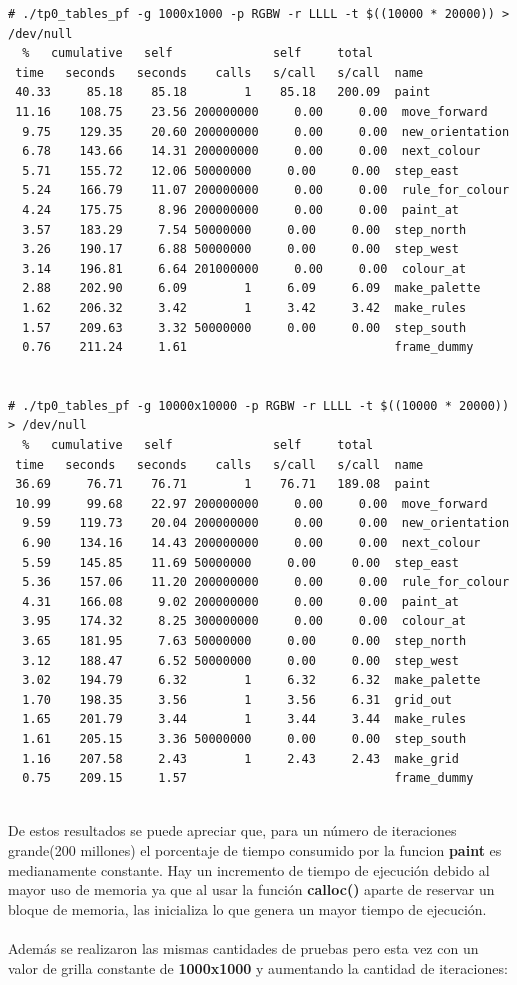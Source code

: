 \documentclass[a4paper, 10pt, twoside, notitlepage]{article}
\begin{document}
\begin{verbatim}
# ./tp0_tables_pf -g 1000x1000 -p RGBW -r LLLL -t $((10000 * 20000)) > /dev/null
  %   cumulative   self              self     total           
 time   seconds   seconds    calls   s/call   s/call  name    
 40.33     85.18    85.18        1    85.18   200.09  paint
 11.16    108.75    23.56 200000000     0.00     0.00  move_forward
  9.75    129.35    20.60 200000000     0.00     0.00  new_orientation
  6.78    143.66    14.31 200000000     0.00     0.00  next_colour
  5.71    155.72    12.06 50000000     0.00     0.00  step_east
  5.24    166.79    11.07 200000000     0.00     0.00  rule_for_colour
  4.24    175.75     8.96 200000000     0.00     0.00  paint_at
  3.57    183.29     7.54 50000000     0.00     0.00  step_north
  3.26    190.17     6.88 50000000     0.00     0.00  step_west
  3.14    196.81     6.64 201000000     0.00     0.00  colour_at
  2.88    202.90     6.09        1     6.09     6.09  make_palette
  1.62    206.32     3.42        1     3.42     3.42  make_rules
  1.57    209.63     3.32 50000000     0.00     0.00  step_south
  0.76    211.24     1.61                             frame_dummy


# ./tp0_tables_pf -g 10000x10000 -p RGBW -r LLLL -t $((10000 * 20000)) > /dev/null
  %   cumulative   self              self     total           
 time   seconds   seconds    calls   s/call   s/call  name    
 36.69     76.71    76.71        1    76.71   189.08  paint
 10.99     99.68    22.97 200000000     0.00     0.00  move_forward
  9.59    119.73    20.04 200000000     0.00     0.00  new_orientation
  6.90    134.16    14.43 200000000     0.00     0.00  next_colour
  5.59    145.85    11.69 50000000     0.00     0.00  step_east
  5.36    157.06    11.20 200000000     0.00     0.00  rule_for_colour
  4.31    166.08     9.02 200000000     0.00     0.00  paint_at
  3.95    174.32     8.25 300000000     0.00     0.00  colour_at
  3.65    181.95     7.63 50000000     0.00     0.00  step_north
  3.12    188.47     6.52 50000000     0.00     0.00  step_west
  3.02    194.79     6.32        1     6.32     6.32  make_palette
  1.70    198.35     3.56        1     3.56     6.31  grid_out
  1.65    201.79     3.44        1     3.44     3.44  make_rules
  1.61    205.15     3.36 50000000     0.00     0.00  step_south
  1.16    207.58     2.43        1     2.43     2.43  make_grid
  0.75    209.15     1.57                             frame_dummy


\end{verbatim}
\normalsize
De estos resultados se puede apreciar que, para un número de iteraciones grande(200 millones) el porcentaje de tiempo consumido por la funcion \textbf{paint} es medianamente constante. Hay un incremento de tiempo de ejecución debido al mayor uso de memoria ya que al usar la función \textbf{calloc()} aparte de reservar un bloque de memoria, las inicializa lo que genera un mayor tiempo de ejecución.\\
\\
Además se realizaron las mismas cantidades de pruebas pero esta vez con un valor de grilla constante de \textbf{1000x1000} y aumentando la cantidad de iteraciones:
\end{document}

